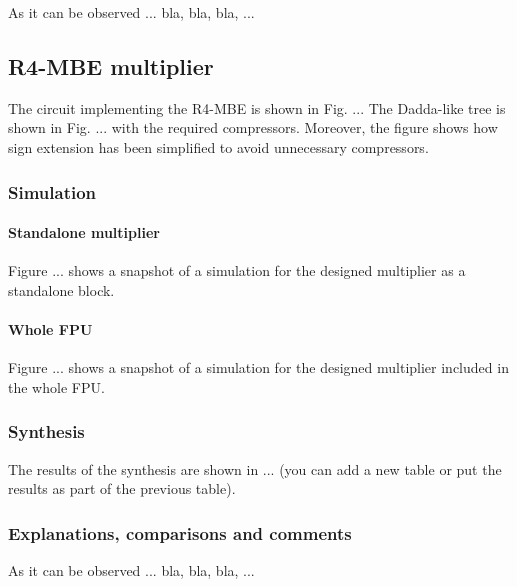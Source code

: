 As it can be observed ... bla, bla, bla, ...

\subsection{R4-MBE multiplier}

The circuit implementing the R4-MBE is shown in Fig. ...
The Dadda-like tree is shown in Fig. ... with the required compressors. Moreover, the figure shows how sign extension has been simplified to avoid unnecessary compressors.

\subsubsection{Simulation}

\paragraph{Standalone multiplier}

Figure ... shows a snapshot of a simulation for the designed multiplier as a standalone block.

\paragraph{Whole FPU}

Figure ... shows a snapshot of a simulation for the designed multiplier included in the whole FPU.

\subsubsection{Synthesis}

The results of the synthesis are shown in ... (you can add a new table or put the results as part of the previous table).

\subsubsection{Explanations, comparisons and comments}

As it can be observed ... bla, bla, bla, ...

